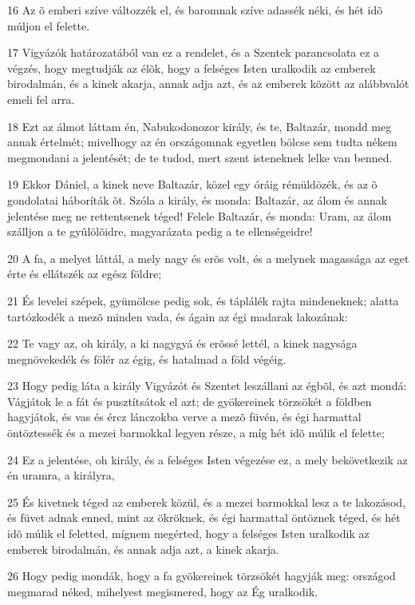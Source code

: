 \par 16 Az õ emberi szíve változzék el, és baromnak szíve adassék néki, és hét idõ múljon el felette.
\par 17 Vigyázók határozatából van ez a rendelet, és a Szentek parancsolata ez a végzés, hogy megtudják az élõk, hogy a felséges Isten uralkodik az emberek birodalmán, és a kinek akarja, annak adja azt, és az emberek között az alábbvalót emeli fel arra.
\par 18 Ezt az álmot láttam én, Nabukodonozor király, és te, Baltazár, mondd meg annak értelmét; mivelhogy az én országomnak egyetlen bölcse sem tudta nékem megmondani a jelentését; de te tudod, mert szent isteneknek lelke van benned.
\par 19 Ekkor Dániel, a kinek neve Baltazár, közel egy óráig rémüldözék, és az õ gondolatai háboríták õt. Szóla a király, és monda: Baltazár, az álom és annak jelentése meg ne rettentsenek téged! Felele Baltazár, és monda: Uram, az álom szálljon a te gyûlölõidre, magyarázata pedig a te ellenségeidre!
\par 20 A fa, a melyet láttál, a mely nagy és erõs volt, és a melynek magassága az eget érte és ellátszék az egész földre;
\par 21 És levelei szépek, gyümölcse pedig sok, és táplálék rajta mindeneknek; alatta tartózkodék a mezõ minden vada, és ágain az égi madarak lakozának:
\par 22 Te vagy az, oh király, a ki nagygyá és erõssé lettél, a kinek nagysága megnövekedék és fölér az égig, és hatalmad a föld végéig.
\par 23 Hogy pedig láta a király Vigyázót és Szentet leszállani az égbõl, és azt mondá: Vágjátok le a fát és pusztítsátok el azt; de gyökereinek törzsökét a földben hagyjátok, és vas és ércz lánczokba verve a mezõ füvén, és égi harmattal öntöztessék és a mezei barmokkal legyen része, a míg hét idõ múlik el felette;
\par 24 Ez a jelentése, oh király, és a felséges Isten végezése ez, a mely bekövetkezik az én uramra, a királyra,
\par 25 És kivetnek téged az emberek közül, és a mezei barmokkal lesz a te lakozásod, és füvet adnak enned, mint az ökröknek, és égi harmattal öntöznek téged, és hét idõ múlik el feletted, mígnem megérted, hogy a felséges  Isten uralkodik az emberek birodalmán, és annak adja azt, a kinek akarja.
\par 26 Hogy pedig mondák, hogy a fa gyökereinek törzsökét hagyják meg: országod megmarad néked, mihelyest megismered, hogy az Ég uralkodik.
